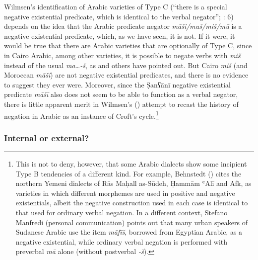 \documentclass[output=paper]{langsci/langscibook}
\begin{document}
Wilmsen’s identification of Arabic varieties of Type C (“there is a special negative existential predicate, which is identical to the verbal negator”; \citealt{Croft1991}: 6) depends on the idea that the Arabic predicate negator \textit{māši/muš/miš/mū} is a negative existential predicate, which, as we have seen, it is not. If it were, it would be true that there are Arabic varieties that are optionally of Type C, since in Cairo Arabic, among other varieties, it is possible to negate verbs with \textit{miš} instead of the usual \textit{ma…-š}, as \citet{Mughazy2003} and others have pointed out. But Cairo \textit{miš} (and Moroccan \textit{māši}) are not negative existential predicates, and there is no evidence to suggest they ever were. Moreover, since the Ṣanʕānī negative existential predicate \textit{māšī} also does not seem to be able to function as a verbal negator, there is little apparent merit in Wilmsen's (\citeyear{Wilmsen2014}) attempt to recast the history of negation in Arabic as an instance of Croft’s cycle.\footnote{This is not to deny, however, that some Arabic dialects show some incipient Type B tendencies of a different kind. For example, Behnstedt (\citeyear[347]{Behnstedt2016Yemen}) cites the northern Yemeni dialects of Rās Maḥall as-Sūdeh, Ḥammām ʿAlī and Afk, as varieties in which different morphemes are used in positive and negative existentials, albeit the negative construction used in each case is identical to that used for ordinary verbal negation. In a different context, Stefano Manfredi (personal communication) points out that many urban speakers of Sudanese Arabic use the item \textit{māfīš}, borrowed from Egyptian Arabic, as a negative existential, while ordinary verbal negation is performed with preverbal \textit{mā} alone (without postverbal \textit{{}-š}).} 




\subsubsection{Internal or external?}
\end{document}
